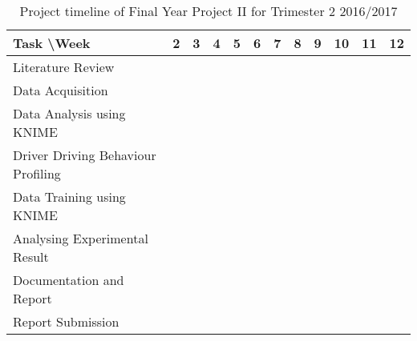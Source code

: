 \begin{table}[h!]
\begin{tabular}{|l|c|c|c|c|c|c|c|c|c|c|c|}
\hline
Task \textbackslash Week & 2 & 3 & 4 & 5 & 6 & 7 & 8 & 9 & 10 & 11 & 12 \\

\hline
Literature Review & \cellcolor[HTML]{000000} & \cellcolor[HTML]{000000} & \cellcolor[HTML]{000000} & & & & & & & &\\

\hline
Data Acquisition &  \cellcolor[HTML]{000000} & \cellcolor[HTML]{000000} & \cellcolor[HTML]{000000} & \cellcolor[HTML]{000000} & \cellcolor[HTML]{000000} & & & & & & \\

\hline
Data Analysis using KNIME & & & & & \cellcolor[HTML]{000000} & \cellcolor[HTML]{000000} & & & & & \\

\hline
Driver Driving Behaviour Profiling & & & & & & & \cellcolor[HTML]{000000} & \cellcolor[HTML]{000000} &  & &\\

\hline
Data Training using KNIME & & & & & & & & \cellcolor[HTML]{000000} & \cellcolor[HTML]{000000} &  & \\

\hline
Analysing Experimental Result & & & & & & & & & \cellcolor[HTML]{000000} & \cellcolor[HTML]{000000} & \\

\hline
Documentation and Report & & & & & & & & & \cellcolor[HTML]{000000} & \cellcolor[HTML]{000000} & \cellcolor[HTML]{000000} \\

\hline
Report Submission & & & & & & & & & & & \cellcolor[HTML]{000000}\\

\hline
\end{tabular}
\label{tbl:gantt2}
\caption{Project timeline of Final Year Project II for Trimester 2 2016/2017}
\end{table}